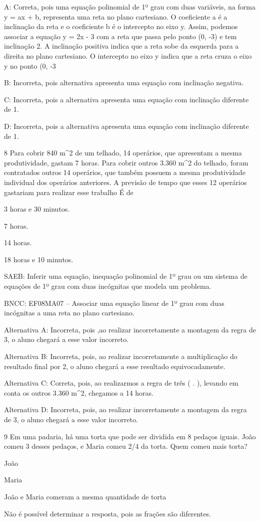{A: Correta, pois uma equação polinomial de 1º grau com duas variáveis,
na forma y = ax + b, representa uma reta no plano cartesiano. O
coeficiente a é a inclinação da reta e o coeficiente b é o intercepto no
eixo y. Assim, podemos associar a equação y = 2x - 3 com a reta que
passa pelo ponto (0, -3) e tem inclinação 2. A inclinação positiva
indica que a reta sobe da esquerda para a direita no plano cartesiano. O
intercepto no eixo y indica que a reta cruza o eixo y no ponto (0, -3

B: Incorreta, pois alternativa apresenta uma equação com inclinação
negativa.

C: Incorreta, pois a alternativa apresenta uma equação com inclinação
diferente de 1.

D: Incorreta, pois a alternativa apresenta uma equação com inclinação
diferente de 1.

\num{8} Para cobrir 840 m^2 de um telhado, 14 operários, que apresentam a
mesma produtividade, gastam 7 horas. Para cobrir outros 3.360 m^2 do
telhado, foram contratados outros 14 operários, que também possuem a
mesma produtividade individual dos operários anteriores. A previsão de
tempo que esses 12 operários gastariam para realizar esse trabalho É de
\item 3 horas e 30 minutos.
\item 7 horas.
\item 14 horas.
\item 18 horas e 10 minutos.

SAEB: Inferir uma equação, inequação polinomial de 1º grau ou um sistema
de equações de 1º grau com duas incógnitas que modela um problema.

BNCC: EF08MA07 -- Associar uma equação linear de 1º grau com duas
incógnitas a uma reta no plano cartesiano.

Alternativa A: Incorreta, pois ,ao realizar incorretamente a montagem da
regra de 3, o aluno chegará a esse valor incorreto.

Alternativa B: Incorreta, pois, ao realizar incorretamente a
multiplicação do resultado final por 2, o aluno chegará a esse resultado
equivocadamente.

Alternativa C: Correta, pois, ao realizarmos a regra de três
( . ), levando em conta os outros 3.360 m^2,
chegamos a 14 horas.

Alternativa D: Incorreta, pois, ao realizar incorretamente a montagem da
regra de 3, o aluno chegará a esse valor incorreto.

\num{9} Em uma padaria, há uma torta que pode ser dividida em 8 pedaços
iguais. João comeu 3 desses pedaços, e Maria comeu 2/4 da torta. Quem
comeu mais torta?
\item João
\item Maria
\item João e Maria comeram a mesma quantidade de torta
\item Não é possível determinar a resposta, pois as frações são diferentes.

}
